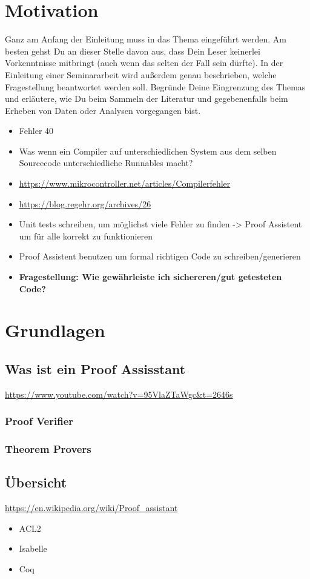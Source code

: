 \section{Motivation}
Ganz am Anfang der Einleitung muss in das Thema eingeführt werden. Am besten gehst Du an dieser Stelle davon aus, dass Dein Leser keinerlei Vorkenntnisse mitbringt (auch wenn das selten der Fall sein dürfte). In der Einleitung einer Seminararbeit wird außerdem genau beschrieben, welche Fragestellung beantwortet werden soll. Begründe Deine Eingrenzung des Themas und erläutere, wie Du beim Sammeln der Literatur und gegebenenfalls beim Erheben von Daten oder Analysen vorgegangen bist.
\begin{itemize}
	\item Fehler 40
	\item Was wenn ein Compiler auf unterschiedlichen System aus dem selben Sourcecode unterschiedliche Runnables macht?
	\item \url{https://www.mikrocontroller.net/articles/Compilerfehler}
	\item \url{https://blog.regehr.org/archives/26}
	\item Unit tests schreiben, um möglichst viele Fehler zu finden -> Proof Assistent um für alle korrekt zu funktionieren
	\item Proof Assistent benutzen um formal richtigen Code zu schreiben/generieren
	\item \textbf{Fragestellung: Wie gewährleiste ich sichereren/gut getesteten Code?}
\end{itemize}


\section{Grundlagen}
\subsection{Was ist ein Proof Assisstant}
\url{https://www.youtube.com/watch?v=95VlaZTaWgc&t=2646s}
\subsubsection{Proof Verifier}
\subsubsection{Theorem Provers}

\subsection{Übersicht}
\url{https://en.wikipedia.org/wiki/Proof_assistant}
\begin{itemize}
	\item ACL2
	\item Isabelle
	\item Coq
\end{itemize}

